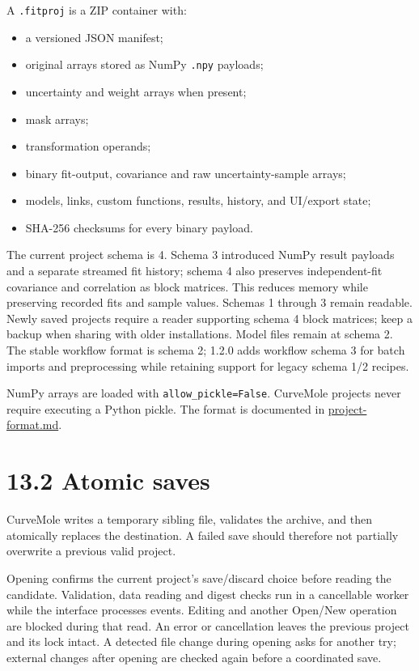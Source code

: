 \documentclass[
  10pt,
  a4paper,
  oneside]{scrreprt}
\providecommand{\tightlist}{%
  \setlength{\itemsep}{0pt}\setlength{\parskip}{0pt}}
\begin{document}
A \texttt{.fitproj} is a ZIP container with:

\begin{itemize}
\tightlist
\item
  a versioned JSON manifest;
\item
  original arrays stored as NumPy \texttt{.npy} payloads;
\item
  uncertainty and weight arrays when present;
\item
  mask arrays;
\item
  transformation operands;
\item
  binary fit-output, covariance and raw uncertainty-sample arrays;
\item
  models, links, custom functions, results, history, and UI/export
  state;
\item
  SHA-256 checksums for every binary payload.
\end{itemize}

The current project schema is 4. Schema 3 introduced NumPy result
payloads and a separate streamed fit history; schema 4 also preserves
independent-fit covariance and correlation as block matrices. This
reduces memory while preserving recorded fits and sample values. Schemas
1 through 3 remain readable. Newly saved projects require a reader
supporting schema 4 block matrices; keep a backup when sharing with
older installations. Model files remain at schema 2. The stable workflow
format is schema 2; 1.2.0 adds workflow schema 3 for batch imports and
preprocessing while retaining support for legacy schema 1/2 recipes.

NumPy arrays are loaded with \texttt{allow\_pickle=False}. CurveMole
projects never require executing a Python pickle. The format is
documented in \url{project-format.md}.

\hypertarget{atomic-saves}{%
\section{13.2 Atomic saves}\label{atomic-saves}}

CurveMole writes a temporary sibling file, validates the archive, and
then atomically replaces the destination. A failed save should therefore
not partially overwrite a previous valid project.

Opening confirms the current project's save/discard choice before
reading the candidate. Validation, data reading and digest checks run in
a cancellable worker while the interface processes events. Editing and
another Open/New operation are blocked during that read. An error or
cancellation leaves the previous project and its lock intact. A detected
file change during opening asks for another try; external changes after
opening are checked again before a coordinated save.
\end{document}
